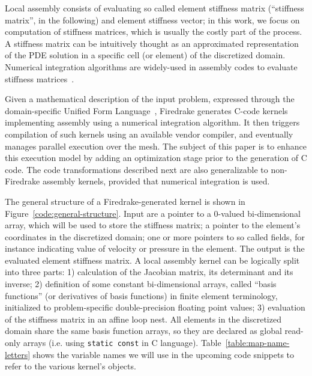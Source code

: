 \documentclass[conference]{IEEEtran}
\begin{document}
Local assembly consists of evaluating so called element stiffness matrix (``stiffness matrix'', in the following) and element stiffness vector; in this work, we focus on computation of stiffness matrices, which is usually the costly part of the process. A stiffness matrix can be intuitively thought as an approximated representation of the PDE solution in a specific cell (or element) of the discretized domain. Numerical integration algorithms are widely-used in assembly codes to evaluate stiffness matrices~\cite{quadrature1, fluidity_manual_v4}. 

Given a mathematical description of the input problem, expressed through the domain-specific Unified Form Language~\cite{ufl}, Firedrake generates C-code kernels implementing assembly using a numerical integration algorithm. It then triggers compilation of such kernels using an available vendor compiler, and eventually manages parallel execution over the mesh. The subject of this paper is to enhance this execution model by adding an optimization stage prior to the generation of C code. The code transformations described next are also generalizable to non-Firedrake assembly kernels, provided that numerical integration is used.

The general structure of a Firedrake-generated kernel is shown in Figure~\ref{code:general-structure}. Input are a pointer to a 0-valued bi-dimensional array, which will be used to store the stiffness matrix; a pointer to the element's coordinates in the discretized domain; one or more pointers to so called fields, for instance indicating value of velocity or pressure in the element. The output is the evaluated element stiffness matrix. A local assembly kernel can be logically split into three parts: 1) calculation of the Jacobian matrix, its determinant and its inverse; 2) definition of some constant bi-dimensional arrays, called ``basis functions'' (or derivatives of basis functions) in finite element terminology, initialized to problem-specific double-precision floating point values; 3) evaluation of the stiffness matrix in an affine loop nest. All elements in the discretized domain share the same basis function arrays, so they are declared as global read-only arrays (i.e. using \texttt{static const} in C language). Table~\ref{table:map-name-letters} shows the variable names we will use in the upcoming code snippets to refer to the various kernel's objects. 
\end{document}
